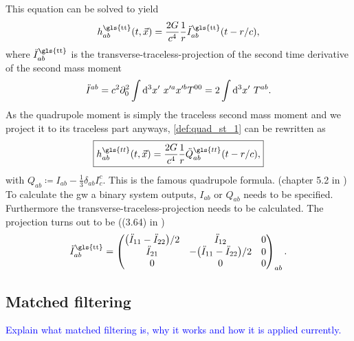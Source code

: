 This equation can be solved to yield
\begin{equation}
h_{ab}^\text{\gls{tt}}\lr{t,\vec{x}}=\frac{2 G}{c^4}\frac{1}{r}\ddot{I}_{ab}^\text{\gls{tt}}\lr{t-r/c},
\end{equation}
where $\ddot{I}_{ab}^\text{\gls{tt}}$ is the transverse-traceless-projection of the second time derivative of the second mass moment
\begin{equation}\label{def:quad_st_1}
\ddot{I}^{ab}=c^2\partial_0^2 \int\mathop{}\!\mathrm{d^3}x'\ x'^a x'^b T^{00} = 2\int\mathop{}\!\mathrm{d^3}x'\ T^{ab}.
\end{equation}
As the quadrupole moment is simply the traceless second mass moment and we project it to its traceless part anyways, \eqref{def:quad_st_1} can be rewritten as
\begin{equation}
\boxed{h^{\gls{tt}}_{ab}\lr{t,\vec{x}} = \frac{2 G}{c^4}\frac{1}{r}\ddot{Q}^{\gls{tt}}_{ab}\lr{t-r/c},}
\end{equation}
with $Q_{ab}\coloneqq I_{ab} - \frac{1}{3}\delta_{ab}I^c_c$. This is the famous quadrupole formula. (chapter 5.2 in \cite{bachelor})\medskip\\

\noindent To calculate the \gls{gw} a binary system outputs, $I_{ab}$ or $Q_{ab}$ needs to be specified. Furthermore the transverse-traceless-projection needs to be calculated. The projection turns out to be ((3.64) in \cite{gwv1})
\begin{equation}
\ddot{I}_{ab}^\text{\gls{tt}}=
\begin{pmatrix}
\lr{\ddot{I}_{11}-\ddot{I}_{22}}/2 & \ddot{I}_{12}                     & 0\\
\ddot{I}_{21}                      & -\lr{\ddot{I}_{11}-\ddot{I}_{22}}/2 & 0\\
0                                  & 0                                 & 0
\end{pmatrix}_{ab}.
\end{equation}

\subsection{Matched filtering}
\textcolor{blue}{Explain what matched filtering is, why it works and how it is applied currently.}